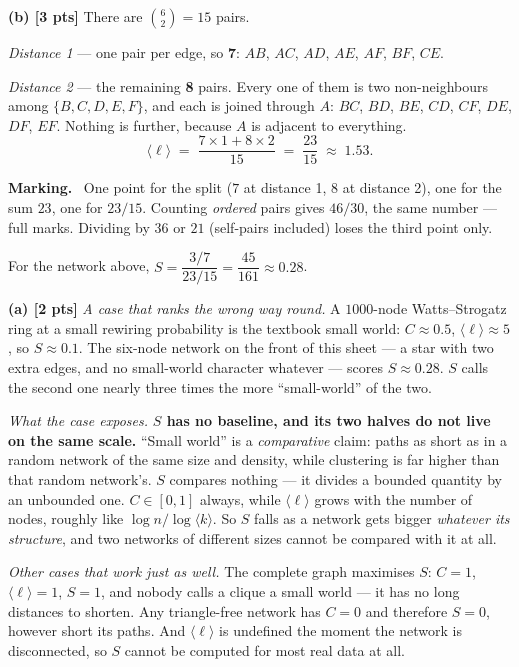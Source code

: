 \documentclass[a4paper, 12pt]{extarticle}
\newenvironment{grading}
  {\begin{tcolorbox}[colback=pltblue!4, colframe=pltblue!35, boxrule=0.5pt,
                     sharp corners, boxsep=2pt, left=6pt, right=6pt,
                     top=4pt, bottom=4pt]\footnotesize\textbf{Marking.}\ }
  {\end{tcolorbox}}
\begin{document}
\textbf{(b) [3 pts]} There are $\binom{6}{2} = 15$ pairs.

\emph{Distance 1} --- one pair per edge, so \textbf{7}: $AB$, $AC$, $AD$,
$AE$, $AF$, $BF$, $CE$.

\emph{Distance 2} --- the remaining \textbf{8} pairs. Every one of them is two
non-neighbours among $\{B,C,D,E,F\}$, and each is joined through $A$: $BC$,
$BD$, $BE$, $CD$, $CF$, $DE$, $DF$, $EF$. Nothing is further, because $A$ is
adjacent to everything.
\[
  \langle \ell \rangle \;=\; \frac{7 \times 1 + 8 \times 2}{15}
  \;=\; \frac{23}{15} \;\approx\; \mathbf{1.53}.
\]

\begin{grading}
One point for the split ($7$ at distance 1, $8$ at distance 2), one for the sum
$23$, one for $23/15$. Counting \emph{ordered} pairs gives $46/30$, the same
number --- full marks. Dividing by $36$ or $21$ (self-pairs included) loses the
third point only.
\end{grading}

\vspace{0.6em}

For the network above, $S = \dfrac{3/7}{23/15} = \dfrac{45}{161} \approx 0.28$.

\textbf{(a) [2 pts]} \emph{A case that ranks the wrong way round.} A
$1000$-node Watts--Strogatz ring at a small rewiring probability is the
textbook small world: $C \approx 0.5$, $\langle\ell\rangle \approx 5$, so
$S \approx 0.1$. The six-node network on the front of this sheet --- a star
with two extra edges, and no small-world character whatever --- scores
$S \approx 0.28$. $S$ calls the second one nearly three times the more
``small-world'' of the two.

\emph{What the case exposes.} \textbf{$S$ has no baseline, and its two halves
do not live on the same scale.} ``Small world'' is a \emph{comparative} claim:
paths as short as in a random network of the same size and density, while
clustering is far higher than that random network's. $S$ compares nothing --- it
divides a bounded quantity by an unbounded one. $C \in [0,1]$ always, while
$\langle \ell \rangle$ grows with the number of nodes, roughly like
$\log n / \log \langle k \rangle$. So $S$ falls as a network gets bigger
\emph{whatever its structure}, and two networks of different sizes cannot be
compared with it at all.

\emph{Other cases that work just as well.} The complete graph maximises $S$:
$C = 1$, $\langle\ell\rangle = 1$, $S = 1$, and nobody calls a clique a small
world --- it has no long distances to shorten. Any triangle-free network has
$C = 0$ and therefore $S = 0$, however short its paths. And
$\langle\ell\rangle$ is undefined the moment the network is disconnected, so
$S$ cannot be computed for most real data at all.
\end{document}

